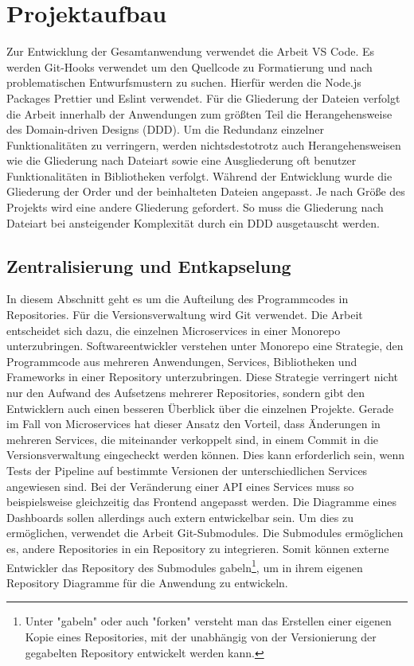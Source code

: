 \section{Projektaufbau}
\label{sec:projektaufbau}
Zur Entwicklung der Gesamtanwendung verwendet die Arbeit VS Code. Es werden Git-Hooks
verwendet um den Quellcode zu Formatierung und nach problematischen Entwurfsmustern
zu suchen. Hierfür werden die Node.js Packages Prettier und Eslint verwendet.
Für die Gliederung der Dateien verfolgt die Arbeit innerhalb der Anwendungen zum größten Teil die Herangehensweise des
Domain-driven Designs (DDD). Um die Redundanz einzelner Funktionalitäten zu verringern, werden \mbox{nichtsdestotrotz} auch Herangehensweisen
wie die Gliederung nach Dateiart sowie eine Ausgliederung oft benutzer Funktionalitäten in Bibliotheken verfolgt. Während der Entwicklung
wurde die Gliederung der Order und der beinhalteten Dateien angepasst. Je nach Größe des Projekts wird eine andere Gliederung gefordert.
So muss die Gliederung nach Dateiart bei ansteigender Komplexität durch ein DDD ausgetauscht werden.

\subsection{Zentralisierung und Entkapselung}
\label{subsec:zentralisierungundentkapselung}
In diesem Abschnitt geht es um die Aufteilung des
Programmcodes in Repositories. Für die Versionsverwaltung
wird Git verwendet. Die Arbeit entscheidet sich dazu,
die einzelnen Microservices in einer Monorepo unterzubringen.
Softwareentwickler verstehen unter Monorepo eine Strategie, den Programmcode
aus mehreren Anwendungen, Services, Bibliotheken und Frameworks
in einer Repository unterzubringen.\cite{MonorepoTrunkBasedDevelopment}
Diese Strategie verringert nicht nur den Aufwand
des Aufsetzens mehrerer Repositories, sondern gibt den
Entwicklern auch einen besseren Überblick über die einzelnen
Projekte. Gerade im Fall von Microservices hat dieser
Ansatz den Vorteil, dass Änderungen in mehreren Services,
die miteinander verkoppelt sind, in einem Commit in die
Versionsverwaltung eingecheckt werden können. Dies kann erforderlich sein,
wenn Tests der Pipeline auf bestimmte Versionen der unterschiedlichen
Services angewiesen sind. Bei der Veränderung einer API eines Services
muss so beispielsweise gleichzeitig das Frontend angepasst werden.
Die Diagramme eines Dashboards sollen allerdings
auch extern entwickelbar sein. Um dies zu ermöglichen, verwendet
die Arbeit Git-Submodules.\cite{GitsubmodulesGitSCM} 
Die Submodules ermöglichen es, andere Repositories in ein
Repository zu integrieren. Somit können externe Entwickler das Repository des
Submodules gabeln\footnote{Unter "gabeln" oder auch "forken" versteht man
das Erstellen einer eigenen Kopie eines Repositories, mit der unabhängig von
der Versionierung der gegabelten Repository entwickelt werden kann.},
um in ihrem eigenen Repository Diagramme für die Anwendung zu entwickeln.

